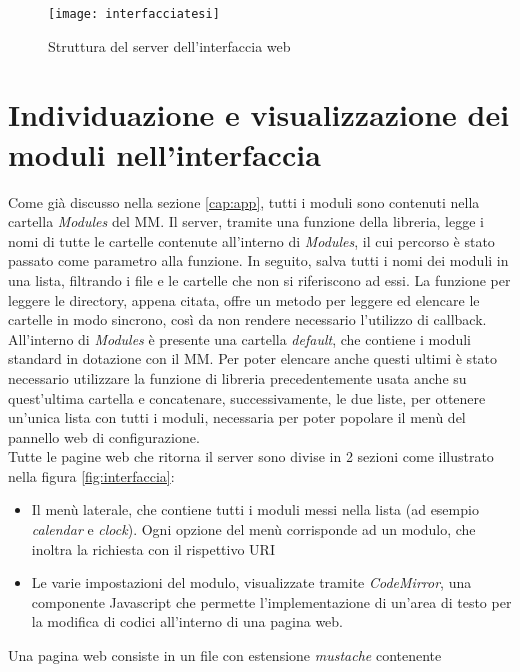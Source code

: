 \begin{figure}[H]
    \texttt{[image: interfacciatesi]}
    \caption{Struttura del server dell'interfaccia web}
    \label{fig:struttinterfaccia}
\end{figure}

\section{Individuazione e visualizzazione dei moduli nell'interfaccia}\label{cap:individuazione}
Come gi\`a discusso nella sezione \ref{cap:app}, tutti i moduli sono contenuti nella
cartella \textit{Modules} del MM. Il server, tramite una funzione della libreria,
legge i nomi di tutte le cartelle contenute all'interno di \textit{Modules}, il cui percorso \`e stato passato
come parametro alla funzione. In seguito, salva tutti i nomi dei moduli
in una lista, filtrando i file e le cartelle che non si riferiscono ad essi.
La funzione per leggere le directory, appena citata, offre un metodo per leggere ed elencare le cartelle in
modo sincrono, cos\`i da non rendere necessario l'utilizzo di callback.\\
All'interno di \textit{Modules} \`e presente una cartella \textit{default}, che contiene
i moduli standard in dotazione con il MM. Per poter elencare anche questi ultimi \`e stato necessario utilizzare la funzione
di libreria precedentemente usata anche su quest'ultima cartella e concatenare, successivamente, le due liste,
per ottenere un'unica lista con tutti i moduli, necessaria per poter popolare il men\`u del pannello web di configurazione.\\
Tutte le pagine web che ritorna il server sono divise in 2 sezioni come illustrato nella figura \ref{fig:interfaccia}:
\begin{itemize}
\item Il men\`u laterale, che contiene tutti i moduli messi nella lista (ad esempio \textit{calendar} e \textit{clock}). Ogni opzione del men\`u corrisponde ad un modulo, che inoltra
la richiesta con il rispettivo URI
\item Le varie impostazioni del modulo, visualizzate tramite \textit{CodeMirror}\cite{CodeMirror}, una componente Javascript
che permette l'implementazione di un'area di testo per la modifica di codici all'interno di una pagina web.\\[1\baselineskip]
\end{itemize}
Una pagina web consiste in un file con estensione \textit{mustache} contenente
